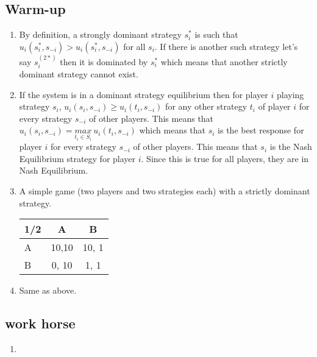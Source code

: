 \documentclass{article}
\begin{document}
\subsection{Warm-up}
\begin{enumerate}
	\item By definition, a strongly dominant strategy $s_i^*$ is such that $u_i(s_i^*, s_{-i}) > u_i(s_i^*, s_{-i})$ for all $s_i$. If there is another such strategy let's say $s_i^{(2*)}$ then it is dominated by $s_i^*$ which means that another strictly dominant strategy cannot exist.
	\item If the system is in a dominant strategy equilibrium then for player $i$ playing strategy $s_i$, $u_i(s_i, s_{-i}) \geq u_i(t_i, s_{-i})$ for any other strategy $t_i$ of player $i$ for every strategy $s_{-i}$ of other players. This means that $u_i(s_i, s_{-i}) = \underset{t_i \in S_i}{max}~u_i(t_i, s_{-i})$ which means that $s_i$ is the best response for player $i$ for every strategy $s_{-i}$ of other players. This means that $s_i$ is the Nash Equilibrium strategy for player $i$. Since this is true for all players, they are in Nash Equilibrium.
	\item A simple game (two players and two strategies each) with a strictly dominant strategy.
	
		\begin{tabular}{lcc}
			\toprule
			1/2 & A & B\\
			\midrule
			A & 10,10 & 10, 1 \\
			B & 0, 10    & 1, 1\\
			\bottomrule
		\end{tabular}
	\item Same as above.
\end{enumerate}
\subsection{work horse}
\begin{enumerate}
	\item 
\end{enumerate}
	
	
\end{document}
